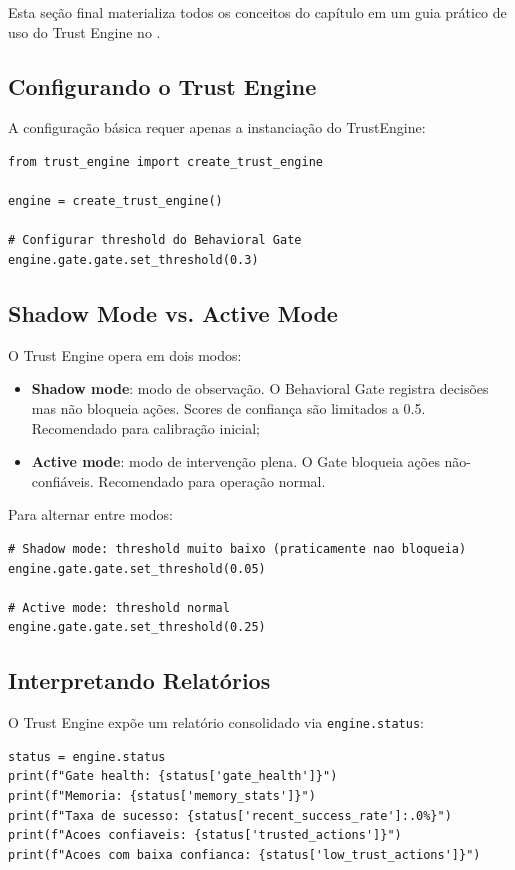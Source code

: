 Esta seção final materializa todos os conceitos do capítulo em um guia
prático de uso do Trust Engine no \opencodeeco{}.

\subsection{Configurando o Trust Engine}

A configuração básica requer apenas a instanciação do TrustEngine:

\begin{lstlisting}[style=pythonstyle]
from trust_engine import create_trust_engine

engine = create_trust_engine()

# Configurar threshold do Behavioral Gate
engine.gate.gate.set_threshold(0.3)
\end{lstlisting}

\subsection{Shadow Mode vs. Active Mode}

O Trust Engine opera em dois modos:

\begin{itemize}
\item \textbf{Shadow mode}: modo de observação. O Behavioral Gate
registra decisões mas não bloqueia ações. Scores de confiança são
limitados a 0.5. Recomendado para calibração inicial;
\item \textbf{Active mode}: modo de intervenção plena. O Gate bloqueia
ações não-confiáveis. Recomendado para operação normal.
\end{itemize}

Para alternar entre modos:
\begin{lstlisting}[style=pythonstyle]
# Shadow mode: threshold muito baixo (praticamente nao bloqueia)
engine.gate.gate.set_threshold(0.05)

# Active mode: threshold normal
engine.gate.gate.set_threshold(0.25)
\end{lstlisting}

\subsection{Interpretando Relatórios}

O Trust Engine expõe um relatório consolidado via \lstinline{engine.status}:

\begin{lstlisting}[style=pythonstyle]
status = engine.status
print(f"Gate health: {status['gate_health']}")
print(f"Memoria: {status['memory_stats']}")
print(f"Taxa de sucesso: {status['recent_success_rate']:.0%}")
print(f"Acoes confiaveis: {status['trusted_actions']}")
print(f"Acoes com baixa confianca: {status['low_trust_actions']}")
\end{lstlisting}

